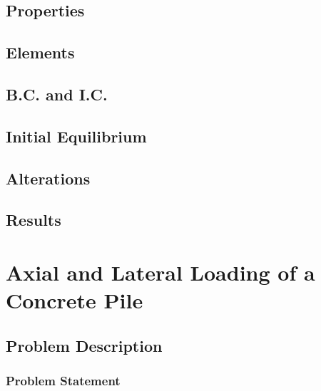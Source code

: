 \documentclass[a4paper, nobind]{templates/ociamthesis}
\begin{document}
\hypertarget{properties}{%
\section{Properties}\label{properties}}

\hypertarget{elements}{%
\section{Elements}\label{elements}}

\hypertarget{b.c.-and-i.c.}{%
\section{B.C. and I.C.}\label{b.c.-and-i.c.}}

\hypertarget{initial-equilibrium}{%
\section{Initial Equilibrium}\label{initial-equilibrium}}

\hypertarget{alterations}{%
\section{Alterations}\label{alterations}}

\hypertarget{results}{%
\section{Results}\label{results}}

\newpage

\hypertarget{axial-and-lateral-loading-of-a-concrete-pile}{%
\chapter{Axial and Lateral Loading of a Concrete Pile}\label{axial-and-lateral-loading-of-a-concrete-pile}}

\hypertarget{problem-description}{%
\section{Problem Description}\label{problem-description}}

\hypertarget{problem-statement}{%
\subsection{Problem Statement}\label{problem-statement}}
\end{document}
